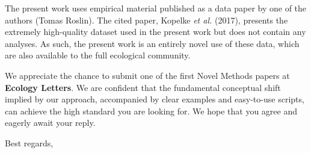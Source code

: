 \documentclass[12pt]{letter}
\begin{document}
\begin{letter}
    The present work uses empirical material published as a data paper by one of the authors (Tomas Roslin). The cited paper, Kopelke \emph{et al.} (2017), presents the extremely high-quality dataset used in the present work but does not contain any analyses. As such, the present work is an entirely novel use of these data, which are also available to the full ecological community.


    We appreciate the chance to submit one of the first Novel Methods papers at \textbf{Ecology Letters}. We are confident that the fundamental conceptual shift implied by our approach, accompanied by clear examples and easy-to-use scripts, can achieve the high standard you are looking for. We hope that you agree and eagerly await your reply.


\closing{Best regards,}


\end{letter}
\end{document}
